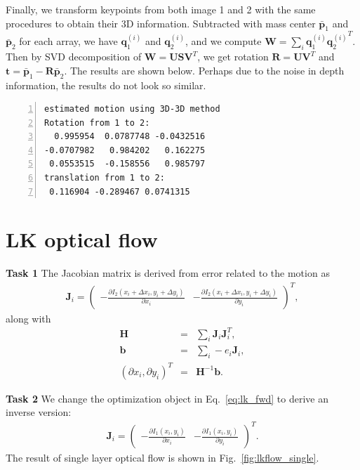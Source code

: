\documentclass[12pt,a4paper]{article}
\newcommand{\vct}[1]{\boldsymbol{#1}}
\newcommand{\mtx}[1]{\mathbf{#1}}
\begin{document}
    Finally, we transform keypoints from both image 1 and 2
    with the same procedures to obtain their 3D information.
    Subtracted with mass center $\vct{\bar{p}}_1$ and $\vct{\bar{p}}_2$ for each array,
    we have $\vct{q}_1^{(i)}$ and $\vct{q}_2^{(i)}$, and
    we compute $\mtx{W} = \sum_i \vct{q}_1^{(i)} {\vct{q}_2^{(i)}}^T$.
    Then by SVD decomposition of $\mtx{W} = \mtx{US}\mtx{V}^T$,
    we get rotation $\mtx{R} = \mtx{U}\mtx{V}^T$
    and $\vct{t} = \vct{\bar{p}}_1 - \mtx{R}\vct{\bar{p}}_2$.
    The results are shown below.
    Perhaps due to the noise in depth information, 
    the results do not look so similar.
    \begin{lstlisting}[frame=single,numbers=left]
estimated motion using 3D-3D method
Rotation from 1 to 2: 
  0.995954  0.0787748 -0.0432516
-0.0707982   0.984202   0.162275
 0.0553515  -0.158556   0.985797
translation from 1 to 2: 
 0.116904 -0.289467 0.0741315
    \end{lstlisting}

    \section{LK optical flow}
    
    \textsf{\textbf{Task 1}}
    The Jacobian matrix is derived from error related to the motion as
    \begin{eqnarray}\label{eq:lk_fwd}
      \vct{J}_i = \begin{pmatrix}
        -\frac{\partial I_2(x_i + \Delta x_i, y_i + \Delta y_i)}{\partial x_i} &
        -\frac{\partial I_2(x_i + \Delta x_i, y_i + \Delta y_i)}{\partial y_i} 
      \end{pmatrix}^T,
    \end{eqnarray}
    along with 
    \begin{eqnarray}
      \mtx{H} &=& \sum_i \vct{J}_{i} \vct{J}_{i}^T, \nonumber\\
      \vct{b} &=& \sum_i - e_i \vct{J}_{i} , \nonumber\\
      (\partial x_i, \partial y_i)^T &=& \mtx{H}^{-1} \vct{b}. 
    \end{eqnarray}
    
    \textsf{\textbf{Task 2}}
    We change the optimization object in Eq.~\ref{eq:lk_fwd}
    to derive an inverse version:
    \begin{eqnarray}\label{eq:lk_inv}
      \vct{J}_i = \begin{pmatrix}
        -\frac{\partial I_1(x_i , y_i)}{\partial x_i} &
        -\frac{\partial I_1(x_i , y_i)}{\partial y_i} 
      \end{pmatrix}^T.
    \end{eqnarray}
    The result of single layer optical flow is shown in Fig.~\ref{fig:lkflow_single}.
    
\end{document}
